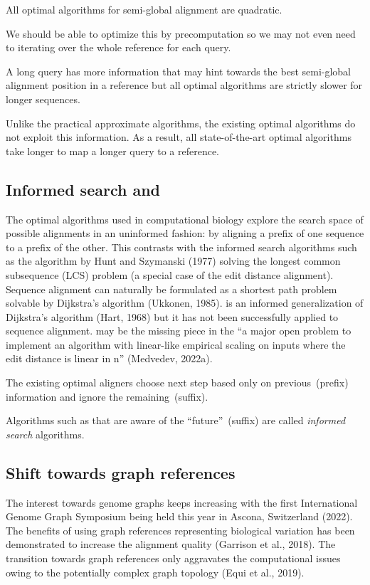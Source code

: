 \begin{observation}
    All optimal algorithms for semi-global alignment are quadratic.
\end{observation}

We should be able to optimize this by precomputation so we may not even need to
iterating over the whole reference for each query.

\begin{paradox}
    A long query has more information that may hint towards the best semi-global
    alignment position in a reference but all optimal algorithms are strictly
    slower for longer sequences.
\end{paradox}

Unlike the practical approximate algorithms, the existing optimal algorithms do
not exploit this information. As a result, all state-of-the-art optimal
algorithms take longer to map a longer query to a reference. 

\subsection*{Informed search and \A}

The optimal algorithms used in computational biology explore the search space of
possible alignments in an uninformed fashion: by aligning a prefix of one
sequence to a prefix of the other. This contrasts with the informed search
algorithms such as the algorithm by Hunt and Szymanski (1977) solving the
longest common subsequence (LCS) problem (a special case of the edit distance
alignment). Sequence alignment can naturally be formulated as a shortest path
problem solvable by Dijkstra's algorithm (Ukkonen, 1985). \A is an informed
generalization of Dijkstra's algorithm (Hart, 1968) but it has not been
successfully applied to sequence alignment. \A may be the missing piece in the
“a major open problem to implement an algorithm with linear-like empirical
scaling on inputs where the edit distance is linear in n” (Medvedev, 2022a).

\begin{observation}
    The existing optimal aligners choose next step based only on
    previous~(prefix) information and ignore the remaining~(suffix).
\end{observation}

Algorithms such as \A that are aware of the ``future''~(suffix) are called
\emph{informed search} algorithms.

\subsection*{Shift towards graph references}

The interest towards genome graphs keeps increasing with the first International
Genome Graph Symposium being held this year in Ascona, Switzerland (2022). The
benefits of using graph references representing biological variation has been
demonstrated to increase the alignment quality (Garrison et al., 2018). The
transition towards graph references only aggravates the computational issues
owing to the potentially complex graph topology (Equi et al., 2019).
